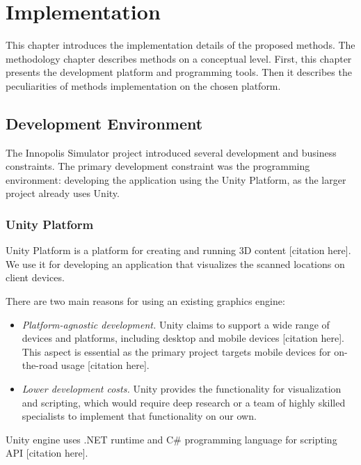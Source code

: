 \chapter{Implementation}
\label{chap:implementation}

\graphicspath{{figs/implementation/}}

This chapter introduces the implementation details of the proposed methods. The methodology chapter describes methods on a conceptual level. First, this chapter presents the development platform and programming tools. Then it describes the peculiarities of methods implementation on the chosen platform.

\section{Development Environment}

The Innopolis Simulator project introduced several development and business constraints. The primary development constraint was the programming environment: developing the application using the Unity Platform, as the larger project already uses Unity.

\subsection{Unity Platform}

Unity Platform is a platform for creating and running 3D content [citation here].  We use it for developing an application that visualizes the scanned locations on client devices.

There are two main reasons for using an existing graphics engine:

\begin{itemize}
    \item \textit{Platform-agnostic development.} Unity claims to support a wide range of devices and platforms, including desktop and mobile devices [citation here]. This aspect is essential as the primary project targets mobile devices for on-the-road usage [citation here].
    
    \item \textit{Lower development costs.} Unity provides the functionality for visualization and scripting, which would require deep research or a team of highly skilled specialists to implement that functionality on our own.
\end{itemize}

Unity engine uses .NET runtime and C\# programming language for scripting API [citation here].

